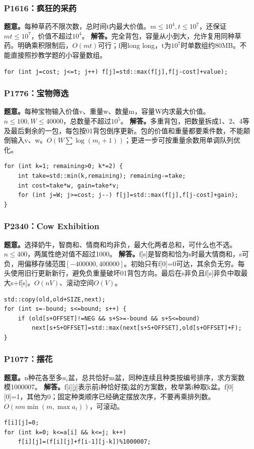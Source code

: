 \subsubsection{P1616：疯狂的采药}
\textbf{题意。}每种草药不限次数，总时间t内最大价值。$m\le10^4,t\le10^7$，还保证$mt\le10^7$，价值不超过$10^4$。
\textbf{解答。}完全背包，容量从小到大，允许复用同种草药。明确乘积限制后，$O(mt)$可行；f用long long，t为$10^7$时单数组约80MB。不能直接照抄教学题的小容量数组。
\begin{lstlisting}
for (int j=cost; j<=t; j++) f[j]=std::max(f[j],f[j-cost]+value);
\end{lstlisting}

\subsubsection{P1776：宝物筛选}
\textbf{题意。}每种宝物输入价值v、重量w、数量m，容量W内求最大价值。$n\le100,W\le40000$，总数量不超过$10^5$。
\textbf{解答。}多重背包，把数量拆成1、2、4等及最后剩余的一包，每包按01背包倒序更新。包的价值和重量都要乘件数，不能颠倒输入v、w。$O(W\sum\log(m_i+1))$；更进一步可按重量余数用单调队列优化。
\begin{lstlisting}
for (int k=1; remaining>0; k*=2) {
    int take=std::min(k,remaining); remaining-=take;
    int cost=take*w, gain=take*v;
    for (int j=W; j>=cost; j--) f[j]=std::max(f[j],f[j-cost]+gain);
}
\end{lstlisting}

\subsubsection{P2340：Cow Exhibition}
\textbf{题意。}选择奶牛，智商和、情商和均非负，最大化两者总和，可什么也不选。$n\le400$，两属性绝对值不超过1000。
\textbf{解答。}f[s]是智商和恰为s时最大情商和，s可负，用偏移存储范围$[-400000,400000]$。初始只有f[0]=0可达，其余负无穷。每头使用旧行更新新行，避免负重量破坏01背包方向。最后在s非负且f[s]非负中取最大s+f[s]。$O(nV)$、滚动空间$O(V)$。
\begin{lstlisting}
std::copy(old,old+SIZE,next);
for (int s=-bound; s<=bound; s++) {
    if (old[s+OFFSET]!=NEG && s+S>=-bound && s+S<=bound)
        next[s+S+OFFSET]=std::max(next[s+S+OFFSET],old[s+OFFSET]+F);
}
\end{lstlisting}

\subsubsection{P1077：摆花}
\textbf{题意。}n种花各至多$a_i$盆，总共恰好m盆，同种连续且种类按编号排序，求方案数模1000007。
\textbf{解答。}f[i][j]表示前i种恰好摆j盆的方案数，枚举第i种取k盆。f[0][0]=1，其他为0；固定种类顺序已经确定摆放次序，不要再乘排列数。$O(nm\min(m,\max a_i))$，可滚动。
\begin{lstlisting}
f[i][j]=0;
for (int k=0; k<=a[i] && k<=j; k++)
    f[i][j]=(f[i][j]+f[i-1][j-k])%1000007;
\end{lstlisting}

